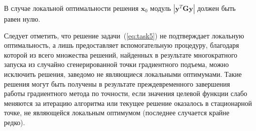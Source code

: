 В случае локальной оптимальности решения $\textbf{x}_0$ модуль $|\textbf{y}^T\textbf{G}\textbf{y}|$ должен быть равен нулю.

Следует отметить, что решение задачи~(\ref{eq:task5}) не подтверждает локальную оптимальность, а лишь предоставляет вспомогательную процедуру, благодаря которой из всего множества решений, найденных в результате многократного запуска из случайно сгенерированной точки
градиентного подъема, можно исключить решения, заведомо не являющиеся локальными оптимумами. Такие решения могут быть получены в результате преждевременного завершения работы градиентного метода по точности, если значения целевой функции слабо меняются за итерацию алгоритма или текущее решение оказалось в стационарной точке, не являющейся локальным оптимумом (последнее случается крайне редко).

